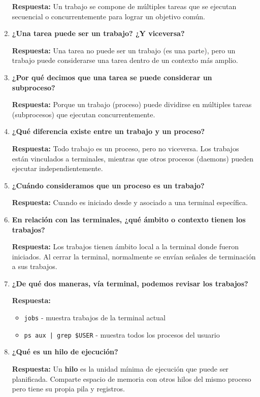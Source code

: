 \documentclass[a4paper,12pt]{article}
\begin{document}
\begin{enumerate}[label=\textbf{Pregunta \arabic*.},left=0pt,itemsep=1.5em]
\textbf{Respuesta:} Un trabajo se compone de múltiples tareas que se ejecutan secuencial o concurrentemente para lograr un objetivo común.

\item \textbf{¿Una tarea puede ser un trabajo? ¿Y viceversa?}

\textbf{Respuesta:} Una tarea no puede ser un trabajo (es una parte), pero un trabajo puede considerarse una tarea dentro de un contexto más amplio.

\item \textbf{¿Por qué decimos que una tarea se puede considerar un subproceso?}

\textbf{Respuesta:} Porque un trabajo (proceso) puede dividirse en múltiples tareas (subprocesos) que ejecutan concurrentemente.

\item \textbf{¿Qué diferencia existe entre un trabajo y un proceso?}

\textbf{Respuesta:} Todo trabajo es un proceso, pero no viceversa. Los trabajos están vinculados a terminales, mientras que otros procesos (daemons) pueden ejecutar independientemente.

\item \textbf{¿Cuándo consideramos que un proceso es un trabajo?}

\textbf{Respuesta:} Cuando es iniciado desde y asociado a una terminal específica.

\item \textbf{En relación con las terminales, ¿qué ámbito o contexto tienen los trabajos?}

\textbf{Respuesta:} Los trabajos tienen ámbito local a la terminal donde fueron iniciados. Al cerrar la terminal, normalmente se envían señales de terminación a sus trabajos.

\item \textbf{¿De qué dos maneras, vía terminal, podemos revisar los trabajos?}

\textbf{Respuesta:}
\begin{itemize}
    \item \texttt{jobs} - muestra trabajos de la terminal actual
    \item \texttt{ps aux | grep \$USER} - muestra todos los procesos del usuario
\end{itemize}

\item \textbf{¿Qué es un hilo de ejecución?}

\textbf{Respuesta:} Un \textbf{hilo} es la unidad mínima de ejecución que puede ser planificada. Comparte espacio de memoria con otros hilos del mismo proceso pero tiene su propia pila y registros.


\end{enumerate}
\end{document}
